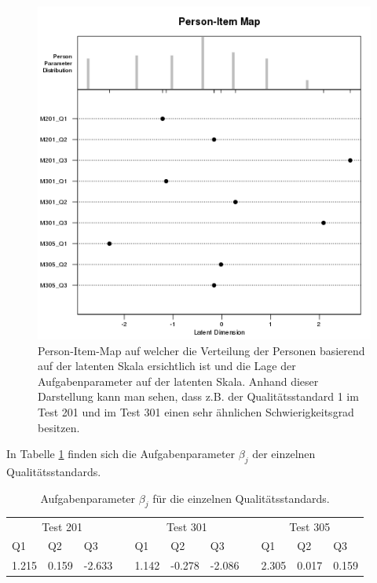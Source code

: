  \begin{figure}[htbp]
 
 \centering
 \includegraphics[width=0.8\linewidth]{graphics/PersonItemMap.png}
 \caption{Person-Item-Map auf welcher die Verteilung der Personen basierend auf der latenten Skala ersichtlich ist und die Lage der Aufgabenparameter auf der latenten Skala. Anhand dieser Darstellung kann man sehen, dass z.B. der Qualitätsstandard 1 im Test 201 und im Test 301 einen sehr ähnlichen Schwierigkeitsgrad besitzen. }
 \label{fig:PersonItemMapQ}
 \end{figure}
 
 In Tabelle \ref{tab:betaQ} finden sich die Aufgabenparameter $\beta_j$ der einzelnen Qualitätsstandards.
 
 \begin{table}[htbp]
   \centering
 \begin{tabular}{@{}lllllllllll@{}}
 \toprule
  \multicolumn{3}{c}{Test 201} &&  \multicolumn{3}{c}{Test 301}&&  \multicolumn{3}{c}{Test 305}\\ 
   \cmidrule{1-3}\cmidrule{5-7}\cmidrule{9-11}
  Q1 & Q2 & Q3 && Q1 & Q2 & Q3 && Q1 & Q2 & Q3  \\ 
 \midrule
   1.215 & 0.159 & -2.633 && 1.142 & -0.278 & -2.086 && 2.305 & 0.017 & 0.159   \\ 
 
 \bottomrule
 \end{tabular} 
   \caption{Aufgabenparameter $\beta_j$ für die einzelnen Qualitätsstandards. }
   \label{tab:betaQ}
 \end{table}
 
